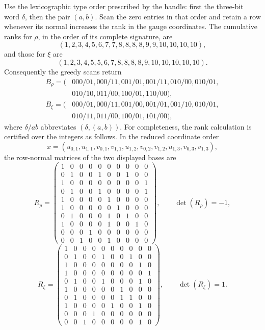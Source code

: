 Use the lexicographic type order prescribed by the handle: first the three-bit word \(\delta\), then the pair \((a,b)\). Scan the zero entries in that order and retain a row whenever its normal increases the rank in the gauge coordinates. The cumulative ranks for \(\rho\), in the order of its complete signature, are
\[
(1,2,3,4,5,6,7,7,8,8,8,8,9,9,10,10,10,10),
\]
and those for \(\xi\) are
\[
(1,2,3,4,5,5,6,7,8,8,8,8,9,10,10,10,10,10).
\]
Consequently the greedy scans return
\[
\begin{aligned}
B_{\rho}=(&000/01,000/11,001/01,001/11,010/00,010/01,\\
          &010/10,011/00,100/01,110/00),\\
B_{\xi}=(&000/01,000/11,001/00,001/01,001/10,010/01,\\
         &010/11,011/00,100/01,101/00),
\end{aligned}
\]
where \(\delta/ab\) abbreviates \((\delta,(a,b))\). For completeness, the rank calculation is certified over the integers as follows. In the reduced coordinate order
\[
x=(u_{0,1},u_{1,1},v_{0,1},v_{1,1},u_{1,2},v_{0,2},v_{1,2},u_{1,3},v_{0,3},v_{1,3}),
\]
the row-normal matrices of the two displayed bases are
\[
R_{\rho}=\begin{pmatrix}
1&0&0&0&0&0&0&0&0&0\\
0&1&0&0&1&0&0&1&0&0\\
1&0&0&0&0&0&0&0&0&1\\
0&1&0&0&1&0&0&0&0&1\\
1&0&0&0&0&1&0&0&0&0\\
1&0&0&0&0&0&1&0&0&0\\
0&1&0&0&0&1&0&1&0&0\\
1&0&0&0&0&1&0&0&1&0\\
0&0&0&1&0&0&0&0&0&0\\
0&0&1&0&0&1&0&0&0&0
\end{pmatrix},
\qquad \det(R_{\rho})=-1,
\]
\[
R_{\xi}=\begin{pmatrix}
1&0&0&0&0&0&0&0&0&0\\
0&1&0&0&1&0&0&1&0&0\\
1&0&0&0&0&0&0&0&1&0\\
1&0&0&0&0&0&0&0&0&1\\
0&1&0&0&1&0&0&0&1&0\\
1&0&0&0&0&0&1&0&0&0\\
0&1&0&0&0&0&1&1&0&0\\
1&0&0&0&0&1&0&0&1&0\\
0&0&0&1&0&0&0&0&0&0\\
0&0&1&0&0&0&0&0&1&0
\end{pmatrix},
\qquad \det(R_{\xi})=1.
\]

